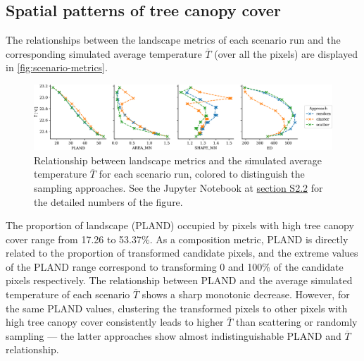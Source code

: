\documentclass[10pt,letterpaper]{article}
\begin{document}
\subsection*{Spatial patterns of tree canopy cover}

The relationships between the landscape metrics of each scenario run and the corresponding simulated average temperature $\overline{T}$ (over all the pixels) are displayed in \autoref{fig:scenario-metrics}.
\begin{figure}
  \begin{adjustwidth}{-.4\textwidth}{0cm}  
    \includegraphics[width=.99\linewidth]{figures/scenario-metrics}
    \caption{\label{fig:scenario-metrics} Relationship between landscape metrics and the simulated average temperature $\overline{T}$ for each scenario run, colored to distinguish the sampling approaches. See the Jupyter Notebook at \hyperref[sec:si-scenario-metrics]{section S2.2} for the detailed numbers of the figure.}
  \end{adjustwidth}
\end{figure}
The proportion of landscape (PLAND) occupied by pixels with high tree canopy cover range from 17.26 to 53.37\%. As a composition metric, PLAND is directly related to the proportion of transformed candidate pixels, and the extreme values of the PLAND range correspond to transforming 0 and 100\% of the candidate pixels respectively.
The relationship between PLAND and the average simulated temperature of each scenario $\overline{T}$ shows a sharp monotonic decrease. However, for the same PLAND values, clustering the transformed pixels to other pixels with high tree canopy cover consistently leads to higher $\overline{T}$ than scattering or randomly sampling --- the latter approaches show almost indistinguishable PLAND and $\overline{T}$ relationship.
\end{document}
